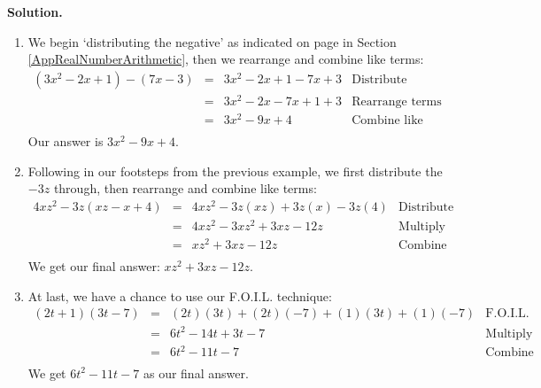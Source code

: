 \begin{ex}
\begin{multicols}{2}
\begin{enumerate}
\end{enumerate}

\end{multicols}



{\bf Solution.}

\begin{enumerate}

\item  We begin `distributing the negative' as indicated on page \pageref{propertiesofnegatives} in Section \ref{AppRealNumberArithmetic}, then we rearrange and combine like terms:\[\begin{array}{rclr}

\left(3x^2 - 2x + 1\right) - (7x-3) &  = & 3x^2-2x+1 - 7x + 3 & \text{Distribute} \\
                                    & = & 3x^2  -2x - 7x + 1 + 3 & \text{Rearrange terms} \\
																		& = & 3x^2 - 9x + 4 & \text{Combine like terms}  \\ 
																		\end {array} \] Our answer is $3x^2 - 9x + 4$.

\item  Following in our footsteps from the previous example, we first distribute the $-3z$ through, then rearrange and combine like terms:\[ \begin{array}{rclr}

4xz^2 - 3z(xz - x + 4) & = & 4xz^2 - 3z(xz) + 3z (x) - 3z(4) & \text{Distribute} \\
                       & = & 4xz^2 - 3xz^2 + 3xz - 12 z & \text{Multiply} \\
											 & = & xz^2+ 3xz - 12 z & \text{Combine like terms} \\

\end{array}\] We get our final answer: $xz^2+ 3xz - 12z$.


\item  At last, we have a chance to use our F.O.I.L. technique:\[ \begin{array}{rclr}

(2t+1)(3t - 7) & = & (2t)(3t) + (2t)(-7) + (1)(3t) + (1)(-7) & \text{F.O.I.L.} \\
               & = & 6t^2 - 14t + 3t - 7 & \text{Multiply} \\
							 & = & 6t^2 - 11t - 7 & \text{Combine like terms} \\
							\end{array} \] We get $6t^2 - 11t - 7$ as our final answer.


\end{enumerate}
\end{ex}
